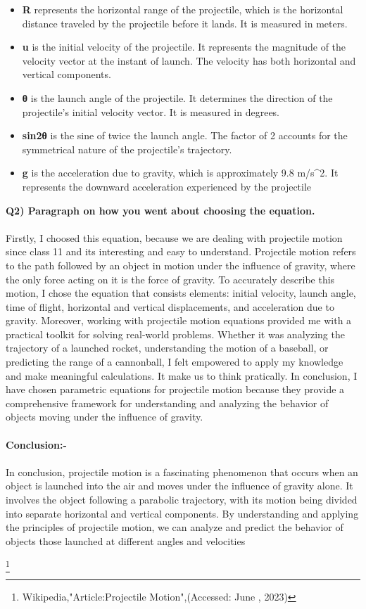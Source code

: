 \documentclass{article}
\begin{document}
\begin{itemize}
\item
  \textbf{R} represents the horizontal range of the projectile, which is
  the horizontal distance traveled by the projectile before it lands. It
  is measured in meters.
\item
  \textbf{u} is the initial velocity of the projectile. It represents
  the magnitude of the velocity vector at the instant of launch. The
  velocity has both horizontal and vertical components.
\item
  \textbf{θ} is the launch angle of the projectile. It determines the
  direction of the projectile's initial velocity vector. It is measured
  in degrees.
\item
  \textbf{sin2θ} is the sine of twice the launch angle. The factor of 2
  accounts for the symmetrical nature of the projectile's trajectory.
\item
  \textbf{g} is the acceleration due to gravity, which is approximately
  9.8 m/s\^{}2. It represents the downward acceleration experienced by
  the projectile
\end{itemize}

\textbf{Q2) Paragraph on how you went about choosing the equation.}
\\
\\
Firstly, I choosed this equation, because we are dealing with projectile
motion since class 11 and its interesting and easy to understand.
Projectile motion refers to the path followed by an object in motion
under the influence of gravity, where the only force acting on it is the
force of gravity. To accurately describe this motion, I chose the
equation that consists elements: initial velocity, launch angle, time of
flight, horizontal and vertical displacements, and acceleration due to
gravity. Moreover, working with projectile motion equations provided me
with a practical toolkit for solving real-world problems. Whether it was
analyzing the trajectory of a launched rocket, understanding the motion
of a baseball, or predicting the range of a cannonball, I felt empowered
to apply my knowledge and make meaningful calculations. It make us to
think pratically. In conclusion, I have chosen parametric equations for
projectile motion because they provide a comprehensive framework for
understanding and analyzing the behavior of objects moving under the
influence of gravity.
\\
\\
\textbf{Conclusion:-}
\\
\\
In conclusion, projectile motion is a fascinating phenomenon that occurs
when an object is launched into the air and moves under the influence of
gravity alone. It involves the object following a parabolic trajectory,
with its motion being divided into separate horizontal and vertical
components. By understanding and applying the principles of projectile
motion, we can analyze and predict the behavior of objects those launched at different angles and velocities



\footnote{Wikipedia,"Article:Projectile Motion",(Accessed: June , 2023)}
\end{document}
